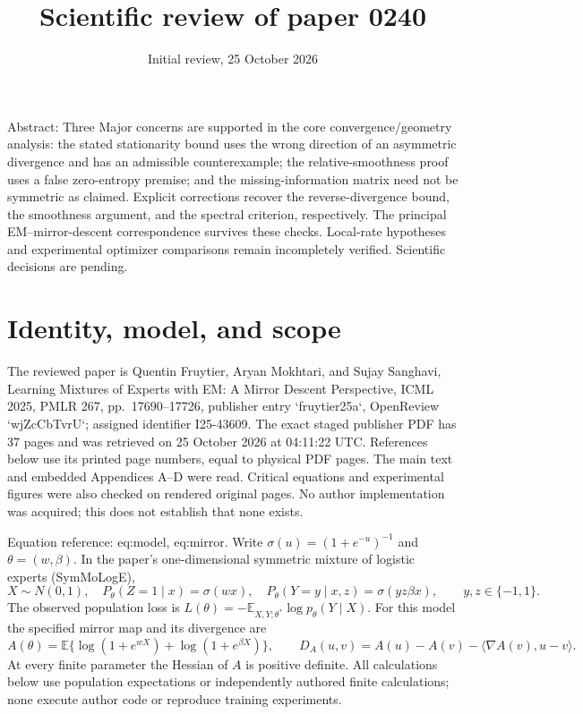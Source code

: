 \documentclass[10pt]{article}
\title{Scientific review of paper 0240}
\author{}
\date{Initial review, 25 October 2026}
\begin{document}
\maketitle
Abstract: Three Major concerns are supported in the core convergence/geometry analysis: the stated stationarity bound uses the wrong direction of an asymmetric divergence and has an admissible counterexample; the relative-smoothness proof uses a false zero-entropy premise; and the missing-information matrix need not be symmetric as claimed. Explicit corrections recover the reverse-divergence bound, the smoothness argument, and the spectral criterion, respectively. The principal EM–mirror-descent correspondence survives these checks. Local-rate hypotheses and experimental optimizer comparisons remain incompletely verified. Scientific decisions are pending.\par
\section*{Identity, model, and scope}
The reviewed paper is Quentin Fruytier, Aryan Mokhtari, and Sujay Sanghavi, Learning Mixtures of Experts with EM: A Mirror Descent Perspective, ICML 2025, PMLR 267, pp. 17690–17726, publisher entry `fruytier25a`, OpenReview `wjZcCbTvrU`; assigned identifier I25-43609. The exact staged publisher PDF has 37 pages and was retrieved on 25 October 2026 at 04:11:22 UTC. References below use its printed page numbers, equal to physical PDF pages. The main text and embedded Appendices A–D were read. Critical equations and experimental figures were also checked on rendered original pages. No author implementation was acquired; this does not establish that none exists.\par
Equation reference: eq:model, eq:mirror. Write \(\sigma(u)=(1+e^{-u})^{-1}\) and \(\theta=(w,\beta)\). In the paper’s one-dimensional symmetric mixture of logistic experts (SymMoLogE), \[X\sim N(0,1),\quad P_\theta(Z=1\mid x)=\sigma(wx),\quad
 P_\theta(Y=y\mid x,z)=\sigma(yz\beta x),\qquad y,z\in\{-1,1\}.
 \] The observed population loss is \(L(\theta)=-\mathbb E_{X,Y;\theta^*}\log p_\theta(Y\mid X)\). For this model the specified mirror map and its divergence are \[A(\theta)=\mathbb E\{\log(1+e^{wX})+\log(1+e^{\beta X})\},\qquad
 D_A(u,v)=A(u)-A(v)-\langle\nabla A(v),u-v\rangle .
 \] At every finite parameter the Hessian of \(A\) is positive definite. All calculations below use population expectations or independently authored finite calculations; none execute author code or reproduce training experiments.\par
\end{document}

